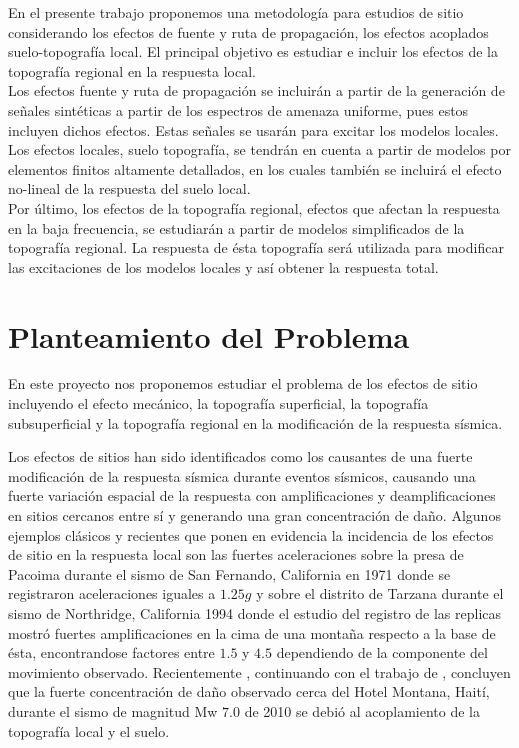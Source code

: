 \documentclass[spanish,letterpaper,12pt,twoside,openany]{article}
\begin{document}
%
En el presente trabajo proponemos una metodología para estudios de sitio considerando los efectos de fuente y ruta de propagación, los efectos acoplados suelo-topografía local. El principal objetivo es estudiar e incluir los efectos de la topografía regional en la respuesta local.\\
%
Los efectos fuente y ruta de propagación se incluirán a partir de la generación de señales sintéticas a partir de los espectros de amenaza uniforme, pues estos incluyen dichos efectos. Estas señales se usarán para excitar los modelos locales.\\
%
Los efectos locales, suelo topografía, se tendrán en cuenta a partir de modelos por elementos finitos altamente detallados, en los cuales también se incluirá el efecto no-lineal de la respuesta del suelo local.\\
%
Por último, los efectos de la topografía regional, efectos que afectan la respuesta en la baja frecuencia, se estudiarán a partir de modelos simplificados de la topografía regional. La respuesta de ésta topografía será utilizada para modificar las excitaciones de los modelos locales y así obtener la respuesta total.
%
%
%
%
%
\section{Planteamiento del Problema}
%
En este proyecto nos proponemos estudiar el problema de los efectos de sitio incluyendo el efecto mecánico, la topografía superficial, la topografía subsuperficial y la topografía regional en la modificación de la respuesta sísmica.

Los efectos de sitios han sido identificados como los causantes de una fuerte modificación de la respuesta sísmica durante eventos sísmicos, causando una fuerte variación espacial de la respuesta con amplificaciones y deamplificaciones en sitios cercanos entre sí y generando una gran concentración de daño. Algunos ejemplos clásicos y recientes que ponen en evidencia la incidencia de los efectos de sitio en la respuesta local son las fuertes aceleraciones sobre la presa de Pacoima durante el sismo de San Fernando, California en 1971 \citep{trifunac1971analysis} donde se registraron aceleraciones iguales a $1.25g$ y sobre el distrito de Tarzana durante el sismo de Northridge, California 1994 \citep{spudich1996directional} donde el estudio del registro de las replicas mostró fuertes amplificaciones en la cima de una montaña respecto a la base de ésta, encontrandose factores entre $1.5$ y $4.5$ dependiendo de la componente del movimiento observado. Recientemente \citep{Assimaki2013}, continuando con el trabajo de \citep{Hough2011}, concluyen que la fuerte concentración de daño observado cerca del Hotel Montana, Haití, durante el sismo de magnitud Mw $7.0$ de 2010 se debió al acoplamiento de la topografía local y el suelo.
\end{document}
